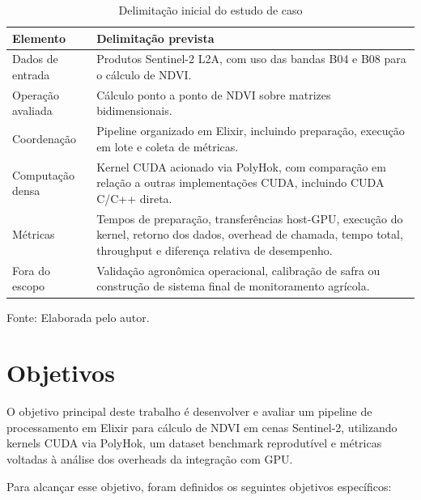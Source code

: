 \documentclass[tcc,capa]{texufpel}
\begin{document}
\begin{table}[H]
\caption{Delimitação inicial do estudo de caso}\label{tab:delimitacao-estudo}
\centering\begin{tabular}{p{4cm}p{10cm}}
\hline
Elemento & Delimitação prevista\\
\hline
{\small Dados de entrada} & {\small Produtos Sentinel-2 L2A, com uso das bandas B04 e B08 para o cálculo de NDVI.}\\
{\small Operação avaliada} & {\small Cálculo ponto a ponto de NDVI sobre matrizes bidimensionais.}\\
{\small Coordenação} & {\small Pipeline organizado em Elixir, incluindo preparação, execução em lote e coleta de métricas.}\\
{\small Computação densa} & {\small Kernel CUDA acionado via PolyHok, com comparação em relação a outras implementações CUDA, incluindo CUDA C/C++ direta.}\\
{\small Métricas} & {\small Tempos de preparação, transferências host-GPU, execução do kernel, retorno dos dados, overhead de chamada, tempo total, throughput e diferença relativa de desempenho.}\\
{\small Fora do escopo} & {\small Validação agronômica operacional, calibração de safra ou construção de sistema final de monitoramento agrícola.}\\
\hline
\end{tabular}
\begin{flushleft}
{\small Fonte: Elaborada pelo autor.}
\end{flushleft}
\end{table}

\section{Objetivos}

O objetivo principal deste trabalho é desenvolver e avaliar um pipeline de
processamento em Elixir para cálculo de NDVI em cenas Sentinel-2, utilizando kernels
CUDA via PolyHok, um dataset benchmark reprodutível e métricas voltadas à análise
dos overheads da integração com GPU.

Para alcançar esse objetivo, foram definidos os seguintes objetivos específicos:
\end{document}
